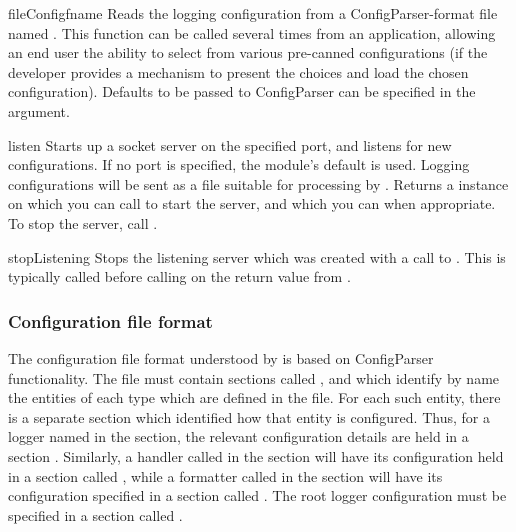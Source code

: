\begin{funcdesc}{fileConfig}{fname}
Reads the logging configuration from a ConfigParser-format file named
. This function can be called several times from an application,
allowing an end user the ability to select from various pre-canned
configurations (if the developer provides a mechanism to present the
choices and load the chosen configuration). Defaults to be passed to
ConfigParser can be specified in the  argument.
\end{funcdesc}

\begin{funcdesc}{listen}{}
Starts up a socket server on the specified port, and listens for new
configurations. If no port is specified, the module's default
 is used. Logging configurations
will be sent as a file suitable for processing by .
Returns a  instance on which you can call 
to start the server, and which you can  when appropriate.
To stop the server, call .
\end{funcdesc}

\begin{funcdesc}{stopListening}{}
Stops the listening server which was created with a call to
. This is typically called before calling 
on the return value from .
\end{funcdesc}

\subsubsection{Configuration file format}

The configuration file format understood by  is
based on ConfigParser functionality. The file must contain sections
called \code{[loggers]}, \code{[handlers]} and \code{[formatters]}
which identify by name the entities of each type which are defined in
the file. For each such entity, there is a separate section which
identified how that entity is configured. Thus, for a logger named
 in the \code{[loggers]} section, the relevant
configuration details are held in a section
. Similarly, a handler called  in
the \code{[handlers]} section will have its configuration held in a
section called , while a formatter called
 in the \code{[formatters]} section will have its
configuration specified in a section called
. The root logger configuration must be
specified in a section called .

